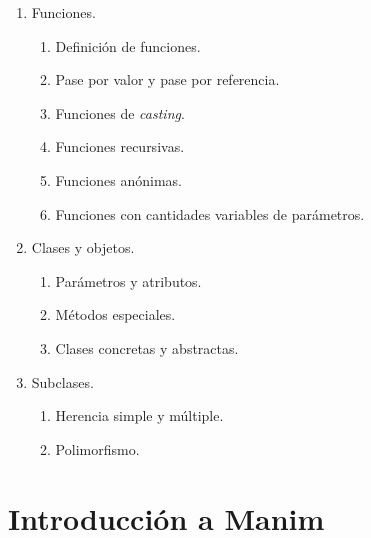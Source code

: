 \documentclass[a4paper]{article}
\begin{document}
\begin{enumerate}[label=\arabic*.]
    \item Funciones.
    \begin{enumerate}[label=3.\arabic*]

        \item Definición de funciones.

        \item Pase por valor y pase por referencia.

        \item Funciones de \emph{casting}.
    
        \item Funciones recursivas.

        \item Funciones anónimas.

        \item Funciones con cantidades variables de parámetros.
    \end{enumerate}

    \item Clases y objetos.
    \begin{enumerate}[label=4.\arabic*]

        \item Parámetros y atributos.
    
        \item Métodos especiales.

        \item Clases concretas y abstractas.
    \end{enumerate}

    \item Subclases.
    \begin{enumerate}[label=5.\arabic*]

        \item Herencia simple y múltiple.
    
        \item Polimorfismo.
    \end{enumerate}
\end{enumerate}

\section{Introducción a Manim} \label{Sec: Introducción a Manim}
\end{document}
